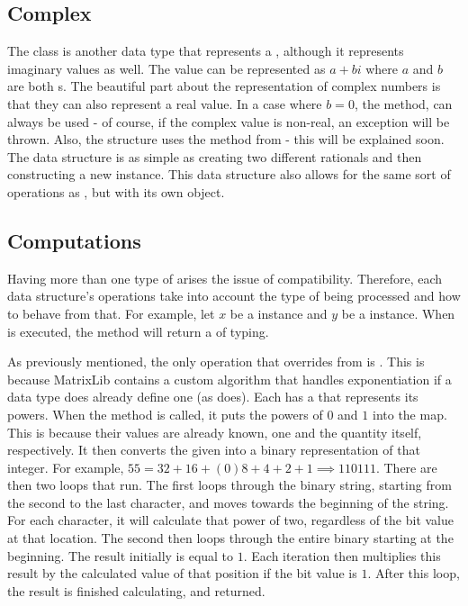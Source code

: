 \subsection*{Complex}
The  class is another data type that represents a , although it represents imaginary values as well.
The  value can be represented as $a+bi$ where $a$ and $b$ are both s.
The beautiful part about the representation of complex numbers is that they can also represent a real value.
In a case where $b=0$, the method,  can always be used - of course, if the complex value is non-real, an exception will be thrown.
Also, the  structure uses the  method from  - this will be explained soon.
The  data structure is as simple as creating two different rationals and then constructing a new instance.
This data structure also allows for the same sort of operations as , but with its own object.

\subsection*{Computations}
Having more than one type of  arises the issue of compatibility.
Therefore, each data structure's operations take into account the type of  being processed and how to behave from that.
For example, let $x$ be a  instance and $y$ be a  instance.
When  is executed, the method will return a  of  typing.

As previously mentioned, the only operation that  overrides from  is .
This is because MatrixLib contains a custom algorithm that handles exponentiation if a data type does already define one (as  does).
Each  has a  that represents its powers.
When the  method is called, it puts the powers of $0$ and $1$ into the map.
This is because their values are already known, one and the quantity itself, respectively.
It then converts the given  into a binary representation of that integer.
For example, $55 = 32+16+(0)8+4+2+1 \implies 110111$.
There are then two loops that run.
The first loops through the binary string, starting from the second to the last character, and moves towards the beginning of the string.
For each character, it will calculate that power of two, regardless of the bit value at that location.
The second then loops through the entire binary starting at the beginning.
The result initially is equal to $1$.
Each iteration then multiplies this result by the calculated value of that position if the bit value is $1$.
After this loop, the result is finished calculating, and returned.

